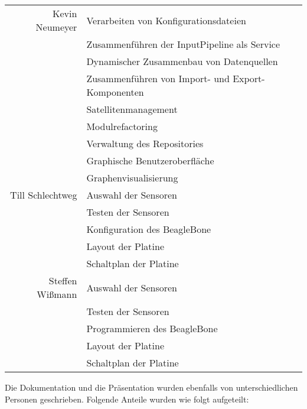 \begin{table}[H]
\begin{tabular}{rl}
		Kevin Neumeyer & Verarbeiten von Konfigurationsdateien \\
		 & Zusammenführen der InputPipeline als Service \\
		 & Dynamischer Zusammenbau von Datenquellen \\
		 & Zusammenführen von Import- und Export-Komponenten \\
		 & Satellitenmanagement \\
		 & Modulrefactoring \\
		 & Verwaltung des Repositories \\
		 & Graphische Benutzeroberfläche \\
		 & Graphenvisualisierung \\
		Till Schlechtweg & Auswahl der Sensoren \\
		& Testen der Sensoren \\
		& Konfiguration des BeagleBone \\
		& Layout der Platine \\
		& Schaltplan der Platine \\
		 Steffen Wißmann & Auswahl der Sensoren \\
		& Testen der Sensoren \\
		& Programmieren des BeagleBone \\
		& Layout der Platine \\
		& Schaltplan der Platine \\
		\bottomrule
	\end{tabular}
\end{table}

Die Dokumentation und die Präsentation wurden ebenfalls von unterschiedlichen Personen geschrieben. Folgende Anteile wurden wie folgt aufgeteilt:


